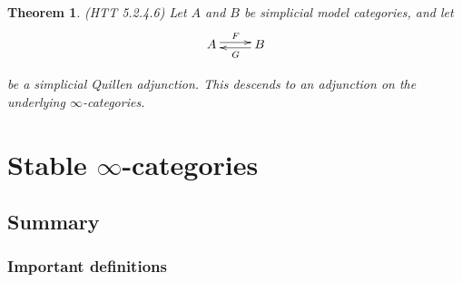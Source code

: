 \documentclass[letterpaper]{article}
\newtheorem{theorem}{Theorem}
\theoremstyle{definition}
\begin{document}
\begin{theorem}(HTT 5.2.4.6)
Let $A$ and $B$ be simplicial model categories, and let 
\[
\xymatrix{A \ar@<.5ex>[r]^F & \ar@<.5ex>[l]^G B}
\]

be a simplicial Quillen adjunction. This descends to an adjunction on
the underlying $\infty$-categories.
\end{theorem}

\section{Stable $\infty$-categories}

\subsection{Summary}
\subsubsection{Important definitions}
\end{document}
